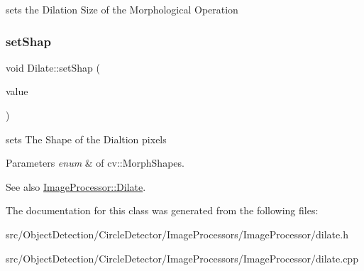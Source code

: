 sets the Dilation Size of the Morphological Operation 

\mbox{\label{class_image_processor_1_1_dilate_a675b54d7fa85c5bce578a625a1f8ec38}} 
\subsubsection{\texorpdfstring{set\+Shap}{setShap}}
{\footnotesize\ttfamily void Dilate\+::set\+Shap (\begin{DoxyParamCaption}\item[{const cv\+::\+Morph\+Shapes \&}]{value }\end{DoxyParamCaption})\hspace{0.3cm}{\ttfamily [slot]}}



sets The Shape of the Dialtion pixels 


\begin{DoxyParams}{Parameters}
{\em enum} & of cv\+::\+Morph\+Shapes. \\
\hline
\end{DoxyParams}
\begin{DoxySeeAlso}{See also}
\hyperlink{class_image_processor_1_1_dilate}{Image\+Processor\+::\+Dilate}. 
\end{DoxySeeAlso}


The documentation for this class was generated from the following files\+:\begin{DoxyCompactItemize}
\item 
src/\+Object\+Detection/\+Circle\+Detector/\+Image\+Processors/\+Image\+Processor/dilate.\+h\item 
src/\+Object\+Detection/\+Circle\+Detector/\+Image\+Processors/\+Image\+Processor/dilate.\+cpp\end{DoxyCompactItemize}
